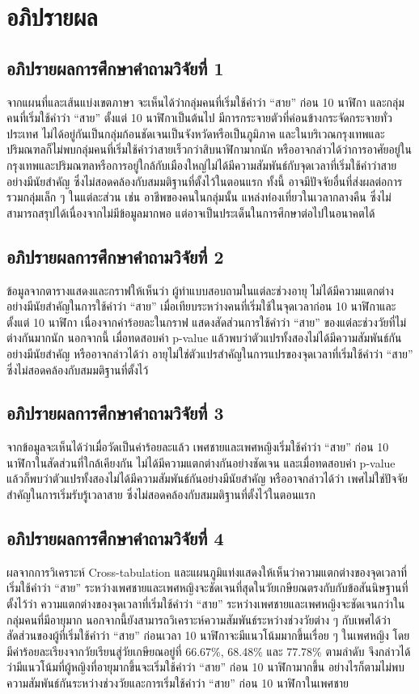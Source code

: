 \documentclass[a4paper]{article}
\begin{document}
\section{อภิปรายผล}
\subsection{อภิปรายผลการศึกษาคำถามวิจัยที่ 1}
    จากแผนที่และเส้นแบ่งเขตภาษา จะเห็นได้ว่ากลุ่มคนที่เริ่มใช้คำว่า “สาย” ก่อน 10 นาฬิกา และกลุ่มคนที่เริ่มใช้คำว่า “สาย” ตั้งแต่ 10 นาฬิกาเป็นต้นไป มีการกระจายตัวที่ค่อนข้างกระจัดกระจายทั่วประเทศ ไม่ได้อยู่กันเป็นกลุ่มก้อนชัดเจนเป็นจังหวัดหรือเป็นภูมิภาค และในบริเวณกรุงเทพและปริมณฑลก็ไม่พบกลุ่มคนที่เริ่มใช้คำว่าสายเร็วกว่าสิบนาฬิกามากนัก หรืออาจกล่าวได้ว่าการอาศัยอยู่ในกรุงเทพและปริมณฑลหรือการอยู่ใกล้กับเมืองใหญ่ไม่ได้มีความสัมพันธ์กับจุดเวลาที่เริ่มใช้คำว่าสายอย่างมีนัยสำคัญ ซึ่งไม่สอดคล้องกับสมมติฐานที่ตั้งไว้ในตอนแรก ทั้งนี้ อาจมีปัจจัยอื่นที่ส่งผลต่อการรวมกลุ่ม\break เล็ก ๆ ในแต่ละส่วน เช่น อาชีพของคนในกลุ่มนั้น แหล่งท่องเที่ยวในเวลากลางคืน ซึ่งไม่สามารถสรุปได้เนื่องจากไม่มีข้อมูลมากพอ แต่อาจเป็นประเด็นในการศึกษาต่อไปในอนาคตได้
\subsection{อภิปรายผลการศึกษาคำถามวิจัยที่ 2}
    ข้อมูลจากตารางแสดงและกราฟให้เห็นว่า ผู้ทำแบบสอบถามในแต่ละช่วงอายุ ไม่ได้มีความแตกต่างอย่างมีนัยสำคัญในการใช้คำว่า “สาย” เมื่อเทียบระหว่างคนที่เริ่มใช้ในจุดเวลาก่อน 10 นาฬิกาและตั้งแต่ 10 นาฬิกา เนื่องจากค่าร้อยละในกราฟ แสดงสัดส่วนการใช้คำว่า “สาย” ของแต่ละช่วงวัยที่ไม่ต่างกันมากนัก นอกจากนี้ เมื่อทดสอบค่า p-value แล้วพบว่าตัวแปรทั้งสองไม่ได้มีความสัมพันธ์กันอย่างมีนัยสำคัญ หรืออาจกล่าวได้ว่า อายุไม่ใช่ตัวแปรสำคัญในการแปรของจุดเวลาที่เริ่มใช้คำว่า “สาย” ซึ่งไม่สอดคล้องกับสมมติฐานที่ตั้งไว้
\subsection{อภิปรายผลการศึกษาคำถามวิจัยที่ 3}
    จากข้อมูลจะเห็นได้ว่าเมื่อวัดเป็นค่าร้อยละแล้ว เพศชายและเพศหญิงเริ่มใช้คำว่า “สาย” ก่อน 10 นาฬิกาในสัดส่วนที่ใกล้เคียงกัน ไม่ได้มีความแตกต่างกันอย่างชัดเจน และเมื่อทดสอบค่า p-value แล้วก็พบว่าตัวแปรทั้งสองไม่ได้มีความสัมพันธ์กันอย่างมีนัยสำคัญ หรืออาจกล่าวได้ว่า เพศไม่ใช่ปัจจัยสำคัญในการเริ่มรับรู้เวลาสาย ซึ่งไม่สอดคล้องกับสมมติฐานที่ตั้งไว้ในตอนแรก
\subsection{อภิปรายผลการศึกษาคำถามวิจัยที่ 4}
    ผลจากการวิเคราะห์ Cross-tabulation และแผนภูมิแท่งแสดงให้เห็นว่าความแตกต่างของจุดเวลาที่เริ่มใช้คำว่า “สาย” ระหว่างเพศชายและเพศหญิงจะชัดเจนที่สุดในวัยเกษียณตรงกับกับข้อสันนิษฐานที่ตั้งไว้ว่า ความแตกต่างของจุดเวลาที่เริ่มใช้คำว่า “สาย” ระหว่างเพศชายและเพศหญิงจะชัดเจนกว่าในกลุ่มคนที่มีอายุมาก นอกจากนี้ยังสามารถวิเคราะห์ความสัมพันธ์ระหว่างช่วงวัยต่าง ๆ กับเพศได้ว่าสัดส่วนของผู้ที่เริ่มใช้คำว่า “สาย” ก่อนเวลา 10 นาฬิกาจะมีแนวโน้มมากขึ้น\break เรื่อย ๆ ในเพศหญิง โดยมีค่าร้อยละเรียงจากวัยเรียนสู่วัยเกษียณอยู่ที่ 66.67\%, 68.48\% และ 77.78\% ตามลำดับ จึงกล่าวได้ว่ามีแนวโน้มที่ผู้หญิงที่อายุมากขึ้นจะเริ่มใช้คำว่า “สาย” ก่อน 10 นาฬิกามากขึ้น อย่างไรก็ตามไม่พบความสัมพันธ์กันระหว่างช่วงวัยและการเริ่มใช้คำว่า “สาย” ก่อน 10 นาฬิกาในเพศชาย
\end{document}

